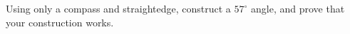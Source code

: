 Using only a compass and straightedge, construct a $57^\circ$ angle, and prove that your construction works.
